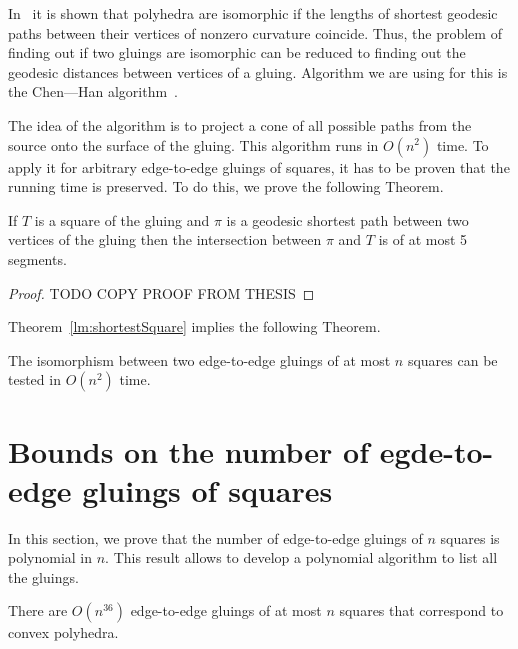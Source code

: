 \documentclass[a4paper,11pt]{article}
\begin{document}
In~\cite{DO07} it is shown that polyhedra are isomorphic if the lengths of shortest geodesic paths between their vertices of nonzero curvature coincide. Thus, the problem of finding out if two gluings are isomorphic can be reduced to finding out the geodesic distances between vertices of a gluing. Algorithm we are using for this is the Chen—Han algorithm~\cite{chen-han}.

The idea of the algorithm is to project a cone of all possible paths from the source onto the surface of the gluing. This algorithm runs in $O(n^2)$ time. To apply it for arbitrary edge-to-edge gluings of squares, it has to be proven that the running time is preserved. To do this, we prove the following Theorem.

\begin{theorem} \label{lm:shortestSquare}
	If $T$ is a square of the gluing and $\pi$ is a geodesic shortest path between two vertices of the gluing then the intersection between $\pi$ and $T$ is of at most 5 segments.
\end{theorem}

\begin{proof}
	TODO COPY PROOF FROM THESIS
\end{proof}

Theorem~\ref{lm:shortestSquare} implies the following Theorem.

\begin{theorem} \label{thm:chruntime}
	The isomorphism between two edge-to-edge gluings of at most $n$ squares can be tested in $O(n^2)$ time.
\end{theorem}

\section{Bounds on the number of egde-to-edge gluings of squares}

In this section, we prove that the number of edge-to-edge gluings of $n$ squares is polynomial in $n$. This result allows to develop a polynomial algorithm to list all the gluings.

\begin{theorem} \label{thm:n36}
	There are $O \left( n^{36} \right)$ edge-to-edge gluings of at most $n$ squares that correspond to convex polyhedra.
\end{theorem}
\end{document}
